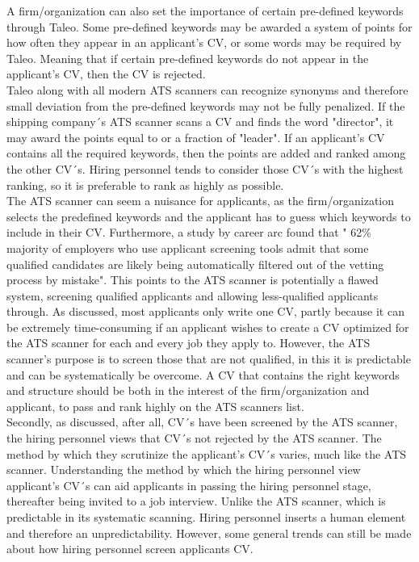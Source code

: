 A firm/organization can also set the importance of certain pre-defined keywords through Taleo.
Some pre-defined keywords may be awarded a system of points for how often they appear in an applicant's CV, or some words may be required by Taleo.
Meaning that if certain pre-defined keywords do not appear in the applicant's CV, then the CV is rejected. \\

Taleo along with all modern ATS scanners can recognize synonyms and therefore small deviation from the pre-defined keywords may not be fully penalized.
If the shipping company´s ATS scanner scans a CV and finds the word "director", it may award the points equal to or a fraction of "leader".
If an applicant's CV contains all the required keywords, then the points are added and ranked among the other CV´s.
Hiring personnel tends to consider those CV´s with the highest ranking, so it is preferable to rank as highly as possible. \\

The ATS scanner can seem a nuisance for applicants, as the firm/organization selects the predefined keywords and the applicant has to guess which keywords to include in their CV.
Furthermore, a study by career arc found that " 62\% majority of employers who use applicant screening tools admit that some qualified candidates are likely being automatically filtered out of the vetting process by mistake".\cite{CV_ATS_Broken_System}
This points to the ATS scanner is potentially a flawed system, screening qualified applicants and allowing less-qualified applicants through.
As discussed, most applicants only write one CV, partly because it can be extremely time-consuming if an applicant wishes to create a CV optimized for the ATS scanner for each and every job they apply to.
However, the ATS scanner's purpose is to screen those that are not qualified, in this it is predictable and can be systematically be overcome.
A CV that contains the right keywords and structure should be both in the interest of the firm/organization and applicant, to pass and rank highly on the ATS scanners list. \\

Secondly, as discussed, after all, CV´s have been screened by the ATS scanner, the hiring personnel views that CV´s not rejected by the ATS scanner.
The method by which they scrutinize the applicant's CV´s varies, much like the ATS scanner.
Understanding the method by which the hiring personnel view applicant's CV´s can aid applicants in passing the hiring personnel stage, thereafter being invited to a job interview.
Unlike the ATS scanner, which is predictable in its systematic scanning. 
Hiring personnel inserts a human element and therefore an unpredictability.
However, some general trends can still be made about how hiring personnel screen applicants CV. \\

